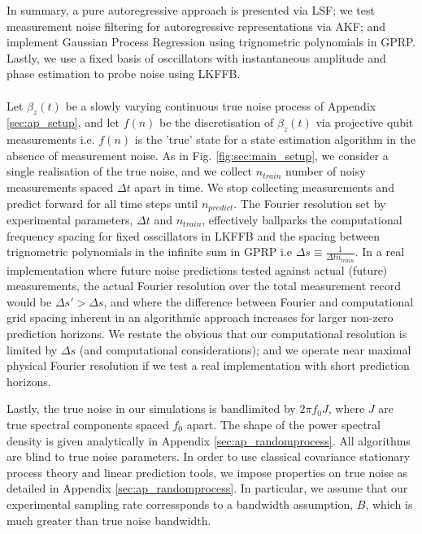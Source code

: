 In summary, a pure autoregressive approach is presented via LSF; we test measurement noise filtering for autoregressive representations via AKF; and implement Gaussian Process Regression using trignometric polynomials in GPRP. Lastly, we use a fixed basis of osccillators with instantaneous amplitude and phase estimation to probe noise using LKFFB.
\\
\\
Let $\beta_z (t)$ be a slowly varying continuous true noise process of Appendix \ref{sec:ap_setup}, and let $f(n)$ be the discretisation of $\beta_z (t)$ via projective qubit measurements i.e.  $f(n)$ is the 'true' state for a state estimation algorithm in the absence of measurement noise. As in Fig. \ref{fig:sec:main_setup}, we consider a single realisation of the true noise, and we collect $n_{train}$ number of noisy measurements spaced $\Delta t$ apart in time. We stop collecting measurements and predict forward for all time steps until $n_{predict}$. The Fourier resolution set by experimental parameters, $\Delta t$ and $n_{train}$, effectively ballparks the computational frequency spacing for fixed osscillators in LKFFB and the spacing between trignometric polynomials in the infinite sum in GPRP i.e $\Delta s \equiv \frac{1}{\Delta t n_{train}}$. In a real implementation where future noise predictions tested against actual (future) measurements, the actual Fourier resolution over the total measurement record would be $\Delta s' > \Delta s$, and where the difference between Fourier and computational grid spacing inherent in an algorithmic approach increases for larger non-zero prediction horizons. We restate the obvious that our computational resolution is limited by $\Delta s$ (and computational considerations); and we operate near maximal physical Fourier resolution if we test a real implementation with short prediction horizons. 


Lastly, the true noise in our simulations is bandlimited by $2\pi f_0J$, where $J$ are true spectral components spaced $f_0$ apart. The shape of the power spectral density is given analytically in Appendix \ref{sec:ap_randomprocess}. All algorithms are blind to true noise parameters. In order to use classical covariance stationary process theory and linear prediction tools, we impose properties on true noise as detailed in Appendix  \ref{sec:ap_randomprocess}. In particular, we assume that our experimental sampling rate corressponds to a bandwidth assumption, $B$, which is much greater than true noise bandwidth.


